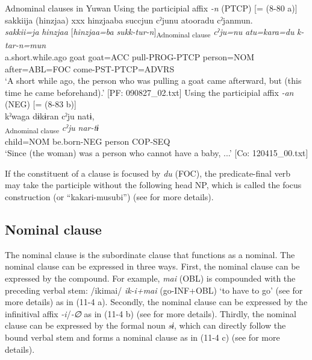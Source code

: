 \ea\label{ex:11-3}  Adnominal clauses in Yuwan
  \ea Using the participial affix \textit{{}-n} (PTCP) [= (8-80 a)]\\
   \glll sakkiija  (hinzjaa)  xxx  hinzjaaba  succjun cˀjunu  atooradu  cˀjanmun.\\
    \textit{sakkii=ja}  \textit{hinzjaa}    [\textit{hinzjaa=ba}  \textit{sukk-tur-n}]\textsubscript{Adnominal clause}   \textit{cˀju=nu}  \textit{atu=kara=du}  \textit{k-tar-n=mun}\\
    a.short.while.ago  goat    goat=ACC  pull-PROG-PTCP  person=NOM  after=ABL=FOC  come-PST-PTCP=ADVRS\\
   \glt ‘A short while ago, the person who was pulling a goat came afterward, but (this time he came beforehand).’    [PF: 090827\_02.txt]
  \ex Using the participial affix \textit{{}-an} (NEG) [= (8-83 b)]\\
   \glll kˀwaga  dɨkɨran  cˀju  natɨ,\\
    [\textit{kˀwa=ga}  \textit{dɨkɨr-an}]\textsubscript{Adnominal clause}  \textit{cˀju}  \textit{nar-tɨ}\\
    child=NOM  be.born-NEG  person  COP-SEQ\\
    ‘Since (the woman) was a person who cannot have a baby, ...’    [Co: 120415\_00.txt]
\z
\z

If the constituent of a clause is focused by \textit{du} (FOC), the predicate-final verb may take the participle without the following head NP, which is called the focus construction (or “kakari-musubi”) (see  for more details).

\subsection{Nominal clause}\label{sec:11.1.3}

The nominal clause is the subordinate clause that functions as a nominal. The nominal clause can be expressed in three ways. First, the nominal clause can be expressed by the compound. For example, \textit{mai} (OBL) is compounded with the preceding verbal stem: /ikimai/ \textit{ik-i+mai} (go-INF+OBL) ‘to have to go’ (see  for more details) as in (11-4 a). Secondly, the nominal clause can be expressed by the infinitival affix \textit{{}-i}/\textit{{}-∅} as in (11-4 b) (see  for more details). Thirdly, the nominal clause can be expressed by the formal noun \textit{sɨ}, which can directly follow the bound verbal stem and forms a nominal clause as in (11-4 c) (see  for more details).

